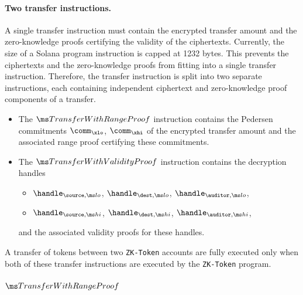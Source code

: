\paragraph{Two transfer instructions.}
A single transfer instruction must contain the encrypted transfer amount and the
zero-knowledge proofs certifying the validity of the ciphertexts. Currently, the
size of a Solana program instruction is capped at 1232 bytes. This prevents the
ciphertexts and the zero-knowledge proofs from fitting into a single transfer
instruction. Therefore, the transfer instruction is split into two separate
instructions, each containing independent ciphertext and zero-knowledge proof
components of a transfer.
\begin{itemize}
  \item The $\TransferWithRangeProof$ instruction contains the Pedersen
    commitments $\comm_{\xlo}$, $\comm_{\xhi}$ of the encrypted transfer amount
    and the associated range proof certifying these commitments.

  \item The $\TransferWithValidityProof$ instruction contains the decryption
    handles 
    \begin{itemize}
      \item $\handle_{\source, \lo}$, $\handle_{\dest, \lo}$, $\handle_{\auditor, \lo}$, 
      \item $\handle_{\source, \hi}$, $\handle_{\dest, \hi}$,
        $\handle_{\auditor, \hi}$,
    \end{itemize}
    and the associated validity proofs for these handles.
\end{itemize}

\noindent
A transfer of tokens between two \texttt{ZK-Token} accounts are fully executed
only when both of these transfer instructions are executed by the
\texttt{ZK-Token} program. 



\begingroup
\setlength{\parindent}{0em}
\setlength{\parskip}{0.75em}


\newpage
\subsubsection{$\TransferWithRangeProof$}

